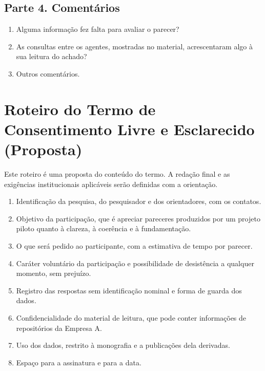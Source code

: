 \begin{apendicesenv}
\section*{Parte 4. Comentários}

\begin{enumerate}
    \item Alguma informação fez falta para avaliar o parecer?
    \item As consultas entre os agentes, mostradas no material, acrescentaram algo à sua leitura do achado?
    \item Outros comentários.
\end{enumerate}

\chapter{Roteiro do Termo de Consentimento Livre e Esclarecido (Proposta)}
\label{ap-tcle}

Este roteiro é uma proposta do conteúdo do termo. A redação final e as exigências institucionais aplicáveis serão definidas com a orientação.

\begin{enumerate}
    \item Identificação da pesquisa, do pesquisador e dos orientadores, com os contatos.
    \item Objetivo da participação, que é apreciar pareceres produzidos por um projeto piloto quanto à clareza, à coerência e à fundamentação.
    \item O que será pedido ao participante, com a estimativa de tempo por parecer.
    \item Caráter voluntário da participação e possibilidade de desistência a qualquer momento, sem prejuízo.
    \item Registro das respostas sem identificação nominal e forma de guarda dos dados.
    \item Confidencialidade do material de leitura, que pode conter informações de repositórios da Empresa A.
    \item Uso dos dados, restrito à monografia e a publicações dela derivadas.
    \item Espaço para a assinatura e para a data.
\end{enumerate}

\end{apendicesenv}
